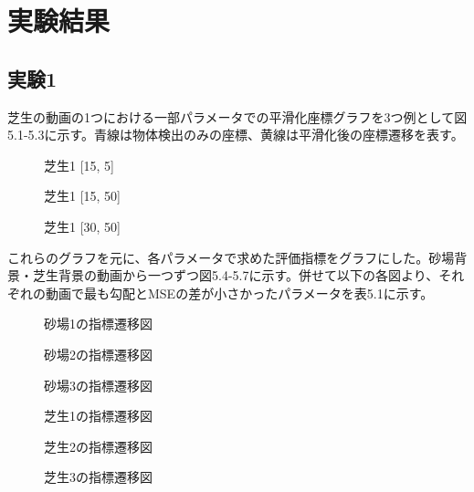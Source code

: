 \documentclass[11pt,a4j]{jreport}
\begin{document}
\section{実験結果}
\subsection{実験1}
芝生の動画の1つにおける一部パラメータでの平滑化座標グラフを3つ例として図5.1-5.3に示す。青線は物体検出のみの座標、黄線は平滑化後の座標遷移を表す。

\begin{figure}[H]
    \centering
    \caption{芝生1 [15, 5]}
    \label{fig:ラベル}
\end{figure}

\begin{figure}[H]
    \centering
    \caption{芝生1 [15, 50]}
    \label{fig:ラベル}
\end{figure}

\begin{figure}[H]
    \centering
    \caption{芝生1 [30, 50]}
    \label{fig:ラベル}
\end{figure}

\vspace{\baselineskip}

これらのグラフを元に、各パラメータで求めた評価指標をグラフにした。砂場背景・芝生背景の動画から一つずつ図5.4-5.7に示す。併せて以下の各図より、それぞれの動画で最も勾配とMSEの差が小さかったパラメータを表5.1に示す。

\vspace{\baselineskip}
\begin{figure}[H]
    \centering
    \caption{砂場1の指標遷移図}
\end{figure}
\begin{figure}[H]
    \centering
    \caption{砂場2の指標遷移図}
\end{figure}
\begin{figure}[H]
    \centering
    \caption{砂場3の指標遷移図}
\end{figure}
\begin{figure}[H]
    \centering
    \caption{芝生1の指標遷移図}
\end{figure}
\begin{figure}[H]
    \centering
    \caption{芝生2の指標遷移図}
\end{figure}
\begin{figure}[H]
    \centering
    \caption{芝生3の指標遷移図}
\end{figure}
\end{document}
